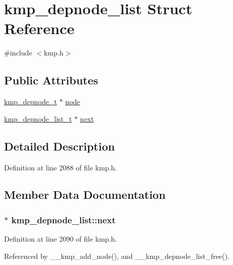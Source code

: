 \hypertarget{structkmp__depnode__list}{\section{kmp\-\_\-depnode\-\_\-list Struct Reference}
\label{structkmp__depnode__list}
}


{\ttfamily \#include $<$kmp.\-h$>$}

\subsection*{Public Attributes}
\begin{DoxyCompactItemize}
\item 
\hyperlink{kmp_8h_a5197537dbef055a1d52ecdcbf5578098}{kmp\-\_\-depnode\-\_\-t} $\ast$ \hyperlink{structkmp__depnode__list_a8873aa1231cab49fdd5ca6dc3b89eca4}{node}
\item 
\hyperlink{kmp_8h_a877b10d3438c1c7864488165c95be189}{kmp\-\_\-depnode\-\_\-list\-\_\-t} $\ast$ \hyperlink{structkmp__depnode__list_a17c86246d585f456214601ceecc1bd0e}{next}
\end{DoxyCompactItemize}


\subsection{Detailed Description}


Definition at line 2088 of file kmp.\-h.



\subsection{Member Data Documentation}
\hypertarget{structkmp__depnode__list_a17c86246d585f456214601ceecc1bd0e}{
\subsubsection[{next}]{$\ast$ kmp\-\_\-depnode\-\_\-list\-::next}}\label{structkmp__depnode__list_a17c86246d585f456214601ceecc1bd0e}


Definition at line 2090 of file kmp.\-h.



Referenced by \-\_\-\-\_\-kmp\-\_\-add\-\_\-node(), and \-\_\-\-\_\-kmp\-\_\-depnode\-\_\-list\-\_\-free().

